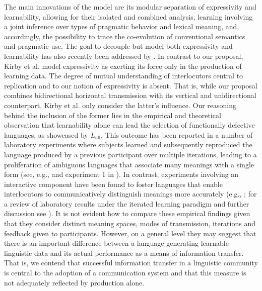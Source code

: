 \documentclass[a4paper]{article}
\newcommand{\mylang}[1]{\ensuremath{L_{\text{#1}}}\xspace} %
\newcommand{\Lall}{\mylang{all}}
\begin{document}
The main innovations of the model are its modular separation of expressivity and learnability, allowing for their isolated and combined analysis, learning involving a joint inference over types of pragmatic behavior and lexical meaning, and, accordingly, the possibility to trace the co-evolution of conventional semantics and pragmatic use. The goal to decouple but model both expressivity and learnability has also recently been addressed by \citet{kirby+etal:2015}. In contrast to our proposal, Kirby et al. model expressivity as exerting its force only in the production of learning data. The degree of mutual understanding of interlocutors central to replication and to our notion of expressivity is absent. That is, while our proposal combines bidirectional horizontal transmission with its vertical and unidirectional counterpart, Kirby et al. only consider the latter's influence. Our reasoning behind the inclusion of the former lies in the empirical and theoretical observation that learnability alone can lead the selection of functionally defective languages, as showcased by $\Lall$. This outcome has been reported in a number of laboratory experiments where subjects learned and subsequently reproduced the language produced by a previous participant over multiple iterations, leading to a proliferation of ambiguous languages that associate many meanings with a single form (see, e.g., \citealt{silvey+etal:2014} and experiment 1 in \citealt{kirby+etal:2008}). In contrast, experiments involving an interactive component have been found to foster languages that enable interlocutors to communicatively distinguish meanings more accurately  (e.g., \citealt{fay+etal:2013}; for a review of laboratory results under the iterated learning paradigm and further discussion see \citealt{kirby+etal:2015, tamariz+kirby:2016}). It is not evident how to compare these empirical findings given that they consider distinct meaning spaces, modes of transmission, iterations and feedback given to participants. However, on a general level they may suggest that there is an important difference between a language generating learnable linguistic data and its actual performance as a means of information transfer. That is, we contend that successful information transfer in a linguistic community is central to the adoption of a communication system and that this measure is not adequately reflected by production alone.
\end{document}
